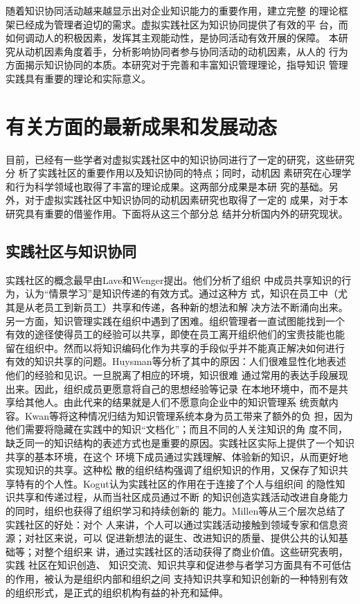 随着知识协同活动越来越显示出对企业知识能力的重要作用，建立完整
的理论框架已经成为管理者迫切的需求。虚拟实践社区为知识协同提供了有效的平
台，而如何调动人的积极因素，发挥其主观能动性，是协同活动有效开展的保障。
本研究从动机因素角度着手，分析影响协同者参与协同活动的动机因素，从人的
行为方面揭示知识协同的本质。本研究对于完善和丰富知识管理理论，指导知识
管理实践具有重要的理论和实际意义。




\section{有关方面的最新成果和发展动态}
目前，已经有一些学者对虚拟实践社区中的知识协同进行了一定的研究，这些研究分
析了实践社区的重要作用以及知识协同的特点；同时，动机因
素研究在心理学和行为科学领域也取得了丰富的理论成果。这两部分成果是本研
究的基础。另外，对于虚拟实践社区中知识协同的动机因素研究也取得了一定的
成果，对于本研究具有重要的借鉴作用。下面将从这三个部分总
结并分析国内外的研究现状。



\subsection{实践社区与知识协同}


实践社区的概念最早由Lave和Wenger提出\cite{lave1991sll}。他们分析了组织
中成员共享知识的行为，认为“情景学习”是知识传递的有效方式。通过这种方
式，知识在员工中（尤其是从老员工到新员工）共享和传递，各种新的想法和解
决方法不断涌向出来。另一方面，知识管理实践在组织中遇到了困难。组织管理者一直试图能找到一个
有效的途径使得员工的经验可以共享，即使在员工离开组织他们的宝贵技能也能
留在组织中。然而以将知识编码化作为共享的手段似乎并不能真正解决如何进行
有效的知识共享的问题。Huysman等分析了其中的原因：人们很难显性化地表述
他们的经验和见识\cite{huysman2002ksp}。一旦脱离了相应的环境，知识很难
通过常用的表达手段展现出来。因此，组织成员更愿意将自己的思想经验等记录
在本地环境中，而不是共享给其他人。由此代来的结果就是人们不愿意向企业中的知识管理系
统贡献内容。Kwan等将这种情况归结为知识管理系统本身为员工带来了额外的负
担，因为他们需要将隐藏在实践中的知识“文档化”；而且不同的人关注知识的角
度不同，缺乏同一的知识结构的表述方式也是重要的原因\cite{MillieKwan2003}。实践社区实际上提供了一个知识共享的基本环境，在这个
环境下成员通过实践理解、体验新的知识，从而更好地实现知识的共享。这种松
散的组织结构强调了组织知识的作用，又保存了知识共享特有的个人性。Kogut认为实践社区的作用在于连接了个人与组织间
的隐性知识共享和传递过程\cite{443473219920801}，从而当社区成员通过不断
的知识创造实践活动改进自身能力的同时，组织也获得了组织学习和持续创新的
能力\cite{wenger1999cpl}。Millen等从三个层次总结了实践社区的好处：对个
人来讲，个人可以通过实践活动接触到领域专家和信息资源；对社区来说，可以
促进新想法的诞生、改进知识的质量、提供公共的认知基础等；对整个组织来
讲，通过实践社区的活动获得了商业价值\cite{millen2002uba}。这些研究表明，实践
社区在知识创造、
知识交流、知识共享和促进参与者学习方面具有不可低估的作用，被认为是组织内部和组织之间
支持知识共享和知识创新的一种特别有效的组织形式，是正式的组织机构有益的补充和延伸。



